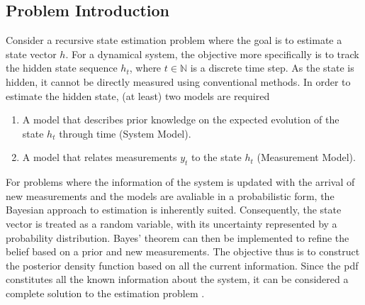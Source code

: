 \documentclass[10pt, a4paper]{article}
\numberwithin{equation}{section}
\begin{document}
\subsection{Problem Introduction}
Consider a recursive state estimation problem where the goal is to estimate a state vector \(h\). For a dynamical system, the objective more specifically is to track the hidden state sequence \(h_t\), where \(t \in \mathbb{N}\) is a discrete time step. As the state is hidden, it cannot be directly measured using conventional methods. In order to estimate the hidden state, (at least) two models are required \parencite{Arulampalam2002}
\begin{enumerate}
    \item A model that describes prior knowledge on the expected evolution of the state \(h_t\) through time (System Model).
    \item A model that relates measurements \(y_t\) to the state \(h_t\) (Measurement Model).
\end{enumerate}

For problems where the information of the system is updated with the arrival of new measurements and the models are avaliable in a probabilistic form, the Bayesian approach to estimation is inherently suited. Consequently, the state vector is treated as a random variable, with its uncertainty represented by a probability distribution. Bayes' theorem can then be implemented to refine the belief based on a prior and new measurements. The objective thus is to construct the posterior density function based on all the current information. Since the pdf constitutes all the known information about the system, it can be considered a complete solution to the estimation problem \parencite{Elfring2021,Arulampalam2002}. 
\end{document}
